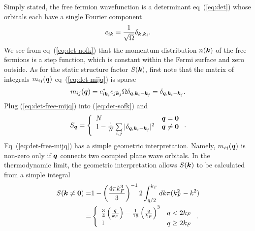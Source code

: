 Simply stated, the free fermion wavefunction is a determinant eq~(\ref{eq:det}) whose orbitals each have a single Fourier component
\begin{align}
c_{i\boldsymbol{k}} = \frac{1}{\sqrt{\Omega}} \delta_{\boldsymbol{k},\boldsymbol{k}_i}.
\end{align}
We see from eq~(\ref{eq:det-nofk}) that the momentum distribution $n(\boldsymbol{k})$ of the free fermions is a step function, which is constant within the Fermi surface and zero outside. As for the static structure factor $S(\boldsymbol{k})$, first note that the matrix of integrals $m_{ij}(\boldsymbol{q})$ eq~(\ref{eq:det-mijq}) is sparse
\begin{align}
m_{ij}(\boldsymbol{q}) = c_{i\boldsymbol{k}_i}^* c_{j\boldsymbol{k}_j} \Omega\delta_{\boldsymbol{q}, \boldsymbol{k}_i-\boldsymbol{k}_j} = \delta_{\boldsymbol{q}, \boldsymbol{k}_i-\boldsymbol{k}_j}. \label{eq:det-free-mijq}
\end{align}
Plug (\ref{eq:det-free-mijq}) into (\ref{eq:det-sofk}) and
\begin{align}
S_{\boldsymbol{q}} = \left\{
\begin{array}{lr}
N & \boldsymbol{q}=\boldsymbol{0} \\
 1-\frac{1}{N}\sum\limits_{i, j} \vert \delta_{\boldsymbol{q}, \boldsymbol{k}_i-\boldsymbol{k}_j} \vert^2 & \boldsymbol{q}\neq\boldsymbol{0}
\end{array}\right..
\end{align}
Eq~(\ref{eq:det-free-mijq}) has a simple geometric interpretation. Namely, $m_{ij}(\boldsymbol{q})$ is non-zero only if $\boldsymbol{q}$ connects two occupied plane wave orbitals. In the thermodynamic limit, the geometric interpretation allows $S(\boldsymbol{k})$ to be calculated from a simple integral
\begin{align}
S(\boldsymbol{k}\neq\boldsymbol{0}) =& 1-\left(\frac{4\pi k_F^3}{3}\right)^{-1}2\int_{q/2}^{k_F} dk \pi(k_F^2-k^2) \nonumber \\
=& \left\{ \begin{array}{lr}
\frac{3}{4}\left(\frac{q}{k_F}\right) - \frac{1}{16} \left(\frac{q}{k_F}\right)^3 & q<2k_F\\
1 & q\ge 2k_F
\end{array}\right..
\end{align}